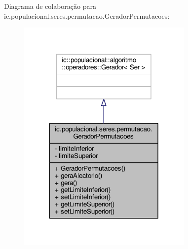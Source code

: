 Diagrama de colaboração para ic.\-populacional.\-seres.\-permutacao.\-Gerador\-Permutacoes\-:\nopagebreak
\begin{figure}[H]
\begin{center}
\leavevmode
\includegraphics[width=244pt]{classic_1_1populacional_1_1seres_1_1permutacao_1_1_gerador_permutacoes__coll__graph}
\end{center}
\end{figure}
